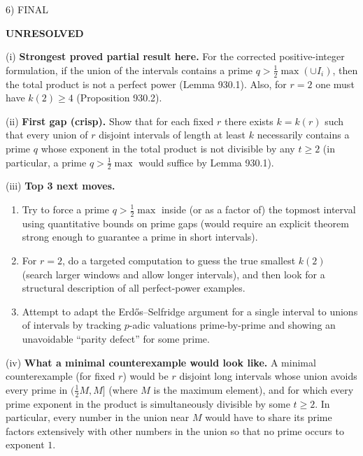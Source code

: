 6) FINAL

\textbf{UNRESOLVED}

(i) \textbf{Strongest proved partial result here.}
For the corrected positive-integer formulation, if the union of the intervals contains a prime $q>\tfrac12\max(\cup I_i)$, then the total product is not a perfect power (Lemma 930.1). Also, for $r=2$ one must have $k(2)\ge 4$ (Proposition 930.2).

(ii) \textbf{First gap (crisp).}
Show that for each fixed $r$ there exists $k=k(r)$ such that every union of $r$ disjoint intervals of length at least $k$ necessarily contains a prime $q$ whose exponent in the total product is not divisible by any $t\ge 2$ (in particular, a prime $q>\tfrac12\max$ would suffice by Lemma 930.1).

(iii) \textbf{Top 3 next moves.}
\begin{enumerate}
\item Try to force a prime $q>\tfrac12\max$ inside (or as a factor of) the topmost interval using quantitative bounds on prime gaps (would require an explicit theorem strong enough to guarantee a prime in short intervals).
\item For $r=2$, do a targeted computation to guess the true smallest $k(2)$ (search larger windows and allow longer intervals), and then look for a structural description of all perfect-power examples.
\item Attempt to adapt the Erd\H{o}s--Selfridge argument for a single interval to unions of intervals by tracking $p$-adic valuations prime-by-prime and showing an unavoidable ``parity defect'' for some prime.
\end{enumerate}

(iv) \textbf{What a minimal counterexample would look like.}
A minimal counterexample (for fixed $r$) would be $r$ disjoint long intervals whose union avoids every prime in $(\tfrac12M,M]$ (where $M$ is the maximum element), and for which every prime exponent in the product is simultaneously divisible by some $t\ge 2$. In particular, every number in the union near $M$ would have to share its prime factors extensively with other numbers in the union so that no prime occurs to exponent $1$.


